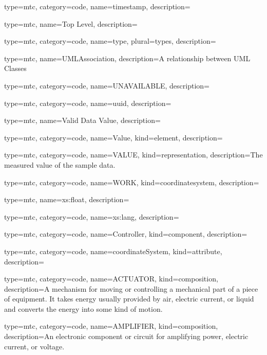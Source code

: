 {
  type=mtc,
  category=code,
  name={timestamp},
  description={}
}


{
  type=mtc,
  name={Top Level},
  description={}
}


{
  type=mtc,
  category=code,
  name={type},
  plural={types},
  description={}
}


{
  type=mtc,
  name=UMLAssociation,
  description={A relationship between UML Classes}
}


{
  type=mtc,
  category=code,
  name={UNAVAILABLE},
  description={}
}


{
  type=mtc,
  category=code,
  name={uuid},
  description={}
}


{
  type=mtc,
  name={Valid Data Value},
  description={}
}


{
  type=mtc,
  category=code,
  name={Value},
  kind={element},
  description={}
}


{
  type=mtc,
  category=code,
  name={VALUE},
  kind={representation},
  description={The measured value of the sample data.}
}


{
  type=mtc,
  category=code,
  name={WORK},
  kind={coordinatesystem},
  description={}
}


{
  type=mtc,
  name={xs:float},
  description={}
}


{
  type=mtc,
  category=code,
  name={xs:lang},
  description={}
}


{
  type=mtc,
  category=code,
  name={Controller},
  kind={component},
  description= {}
}


{
  type=mtc,
  category=code,
  name={coordinateSystem},
  kind={attribute},
  description={}
}


{
  type=mtc,
  category=code,
  name={ACTUATOR},
  kind={composition},
  description={A mechanism for moving or controlling a mechanical part of a piece of equipment.   \newline It takes energy usually provided by air, electric current, or liquid and converts the energy into some kind of motion.  }
}


{
  type=mtc,
  category=code,
  name={AMPLIFIER},
  kind={composition},
  description={An electronic component or circuit for amplifying power, electric current, or voltage.}
}


